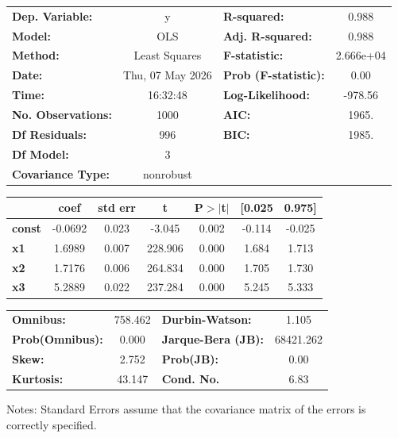 \begin{center}
\begin{tabular}{lclc}
\toprule
\textbf{Dep. Variable:}    &        y         & \textbf{  R-squared:         } &     0.988   \\
\textbf{Model:}            &       OLS        & \textbf{  Adj. R-squared:    } &     0.988   \\
\textbf{Method:}           &  Least Squares   & \textbf{  F-statistic:       } & 2.666e+04   \\
\textbf{Date:}             & Thu, 07 May 2026 & \textbf{  Prob (F-statistic):} &     0.00    \\
\textbf{Time:}             &     16:32:48     & \textbf{  Log-Likelihood:    } &   -978.56   \\
\textbf{No. Observations:} &        1000      & \textbf{  AIC:               } &     1965.   \\
\textbf{Df Residuals:}     &         996      & \textbf{  BIC:               } &     1985.   \\
\textbf{Df Model:}         &           3      & \textbf{                     } &             \\
\textbf{Covariance Type:}  &    nonrobust     & \textbf{                     } &             \\
\bottomrule
\end{tabular}
\begin{tabular}{lcccccc}
               & \textbf{coef} & \textbf{std err} & \textbf{t} & \textbf{P$> |$t$|$} & \textbf{[0.025} & \textbf{0.975]}  \\
\midrule
\textbf{const} &      -0.0692  &        0.023     &    -3.045  &         0.002        &       -0.114    &       -0.025     \\
\textbf{x1}    &       1.6989  &        0.007     &   228.906  &         0.000        &        1.684    &        1.713     \\
\textbf{x2}    &       1.7176  &        0.006     &   264.834  &         0.000        &        1.705    &        1.730     \\
\textbf{x3}    &       5.2889  &        0.022     &   237.284  &         0.000        &        5.245    &        5.333     \\
\bottomrule
\end{tabular}
\begin{tabular}{lclc}
\textbf{Omnibus:}       & 758.462 & \textbf{  Durbin-Watson:     } &     1.105  \\
\textbf{Prob(Omnibus):} &   0.000 & \textbf{  Jarque-Bera (JB):  } & 68421.262  \\
\textbf{Skew:}          &   2.752 & \textbf{  Prob(JB):          } &      0.00  \\
\textbf{Kurtosis:}      &  43.147 & \textbf{  Cond. No.          } &      6.83  \\
\bottomrule
\end{tabular}
\end{center}

Notes: \newline
 [1] Standard Errors assume that the covariance matrix of the errors is correctly specified.